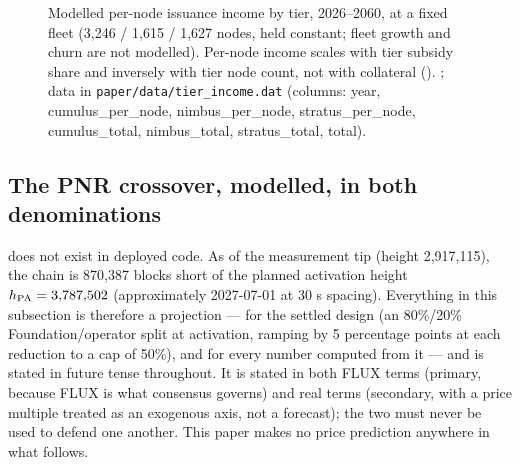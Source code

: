 \begin{figure}[H]
\centering
{}
\caption{Modelled per-node \PoN issuance income by tier, 2026--2060, at a fixed fleet
(3,246 / 1,615 / 1,627 nodes, held constant; fleet growth and churn are not modelled). Per-node
income scales with tier subsidy share and inversely with tier node count, not with collateral
(). ; data in
\texttt{paper/\allowbreak{}data/\allowbreak{}tier\_income.\allowbreak{}dat} (columns: year, cumulus\_per\_node, nimbus\_per\_node,
stratus\_per\_node, cumulus\_total, nimbus\_total, stratus\_total, total).}
\label{fig:eval-tier-income}
\end{figure}

\subsection{The PNR crossover, modelled, in both denominations}
\label{sec:eval-pnr-crossover}

\PNR does not exist in deployed code. As of the measurement tip (height 2,917,115), the chain is
870,387 blocks short of the planned activation height $h_{\mathrm{PA}} = 3{,}787{,}502$ (approximately
2027-07-01 at 30 s spacing). Everything in this subsection is therefore a \planned projection —
 for the settled design (an 80\%/20\% Foundation/operator
split at activation, ramping by 5 percentage points at each \PoN reduction to a cap of 50\%), and
 for every number computed from it — and is
stated in future tense throughout. It is stated in both FLUX terms (primary, because FLUX is what
consensus governs) and real terms (secondary, with a price multiple treated as an exogenous axis,
not a forecast); the two must never be used to defend one another. This paper makes no price
prediction anywhere in what follows.

